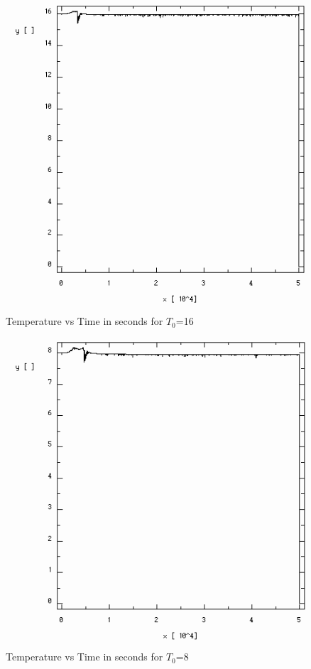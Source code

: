 \documentclass{article}
\begin{document}
\begin{multicols}{2}
\begin{figure}
\centering
\includegraphics[width=\linewidth]{./imgs/temp16_0}
\caption{Temperature vs Time in seconds for $T_0$=16}
\label{fig:temp1}
\end{figure}

\begin{figure}
\centering
\includegraphics[width=\linewidth]{./imgs/temp8_0}
\caption{Temperature vs Time in seconds for $T_0$=8}
\label{fig:temp2}
\end{figure}


\end{multicols}
\end{document}
